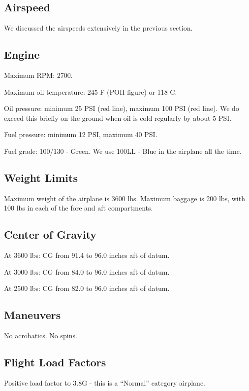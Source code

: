 \subsection{Airspeed}

We discussed the airspeeds extensively in the previous section.

\subsection{Engine}

Maximum RPM: 2700.

Maximum oil temperature: 245 F (POH figure) or 118 C.

Oil pressure: minimum 25 PSI (red line), maximum 100 PSI (red line). We do exceed this briefly on the ground when oil is cold regularly by about 5 PSI.

Fuel pressure: minimum 12 PSI, maximum 40 PSI.

Fuel grade: 100/130 - Green. We use 100LL - Blue in the airplane all the time.

\subsection{Weight Limits}

Maximum weight of the airplane is 3600 lbs. Maximum baggage is 200 lbs, with 100 lbs in each of the fore and aft compartments.

\subsection{Center of Gravity}

At 3600 lbs: CG from 91.4 to 96.0 inches aft of datum.

At 3000 lbs: CG from 84.0 to 96.0 inches aft of datum.

At 2500 lbs: CG from 82.0 to 96.0 inches aft of datum.

\subsection{Maneuvers}

No acrobatics. No spins.

\subsection{Flight Load Factors}

Positive load factor to 3.8G - this is a ``Normal'' category airplane.

